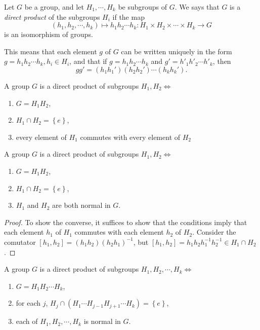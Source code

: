 \begin{definition}
  Let \( G \) be a group, and let \( H_1, \cdots, H_k \) be subgroups of \( G \).
  We says that \( G \) is a \emph{direct product} of the subgroups \( H_i \) if the map
  \[
    (h_1, h_2, \cdots, h_k) \mapsto h_1h_2\cdots h_k: H_1 \times H_2 \times \cdots \times H_k \to G
  \]
  is an isomorphism of groups.
\end{definition}
\begin{remark}
  This means that each element \( g \) of \( G \) can be written uniquely in the form \( g = h_1h_2 \cdots h_k, h_i \in H_i \), and that if \( g = h_1 h_2 \cdots h_k \) and \( g' = h'_1 h'_2 \cdots h'_k \), then
  \[
    g g' = (h_1 h_1')(h_2 h_2') \cdots (h_k h_k').
  \]
\end{remark}

\begin{proposition}
  A group \( G \) is a direct product of subgroups \( H_1, H_2 \iff \)
  \begin{enumerate}
    \item \( G = H_1 H_2 \),
    \item \( H_1 \cap H_2 = \left\lbrace e \right\rbrace \),
    \item every element of \( H_1 \) commutes with every element of \( H_2 \)
  \end{enumerate}
\end{proposition}

\begin{proposition}
  A group \( G \) is a direct product of subgroups \( H_1, H_2 \iff \)
  \begin{enumerate}
    \item \( G = H_1 H_2 \),
    \item \( H_1 \cap H_2 = \left\lbrace e \right\rbrace \),
    \item \( H_1 \) and \( H_2 \) are both normal in \( G \).
  \end{enumerate}
\end{proposition}
\begin{proof}
  To show the converse, it suffices to show that the conditions imply that each element \( h_1 \) of \( H_1 \) commutes with each element \( h_2 \) of \( H_2 \).
  Consider the comutator \( [h_1, h_2] = (h_1 h_2)(h_2 h_1)^{-1} \), but \( [h_1, h_2] = h_1 h_2 h_1^{-1} h_2^{-1} \in H_1 \cap H_2 \).
\end{proof}

\begin{proposition}
  A group \( G \) is a direct product of subgroups \( H_1, H_2, \cdots, H_k \iff \)
  \begin{enumerate}
    \item \( G = H_1 H_2 \cdots H_k \),
    \item for each \( j \), \( H_j \cap (H_1 \cdots H_{j - 1} H_{j + 1} \cdots
      H_k) = \left\lbrace e \right\rbrace \),
    \item each of \( H_1, H_2, \cdots, H_k \) is normal in \( G \).
  \end{enumerate}
\end{proposition}


